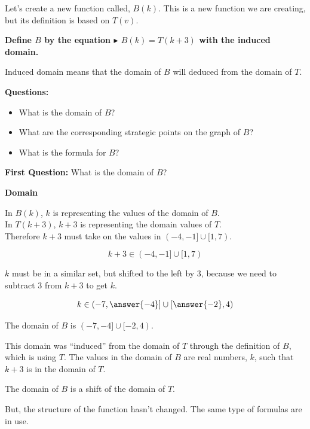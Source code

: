 \documentclass{ximera}
\begin{document}
Let's create a new function called, $B(k)$. This is a new function we are creating, but its definition is based on $T(v)$.


\textbf{Define $B$ by the equation \textcolor{blue!55!black}{$\blacktriangleright$ $B(k) = T(k+3)$} with the induced domain.}



Induced domain means that the domain of $B$ will deduced from the domain of $T$.

\textbf{Questions:} 
\begin{itemize}
  \item What is the domain of $B$?
  \item What are the corresponding strategic points on the graph of $B$?
  \item What is the formula for $B$?
\end{itemize}



\textbf{\textcolor{purple!85!blue}{First Question:}}   What is the domain of $B$?


\begin{explanation} \textbf{\textcolor{red!75!green}{Domain}} 

In $B(k)$, $k$ is representing the values of the domain of $B$. \\
In $T(k + 3)$,  $k+3$ is representing the domain values of $T$.  \\
Therefore $k+3$ must take on the values in $(-4,-1] \cup [1,7)$.

\[     k+3 \in      (-4,-1] \cup [1,7)     \]


$k$ must be in a similar set, but shifted to the left by $3$, because we need to subtract $3$ from $k+3$ to get $k$.


\[     k \in      \left( -7,\answer{-4} \right] \cup \left[ \answer{-2},4 \right)     \]


The domain of $B$ is $(-7,-4] \cup [-2,4)$.   

This domain was ``induced'' from the domain of $T$ through the definition of $B$, which is using $T$.  The values in the domain of $B$ are real numbers, $k$, such that $k+3$ is in the domain of $T$.

The domain of $B$ is a shift of the domain of $T$.  


But, the structure of the function hasn't changed.  The same type of formulas are in use.  



\end{explanation}
\end{document}
